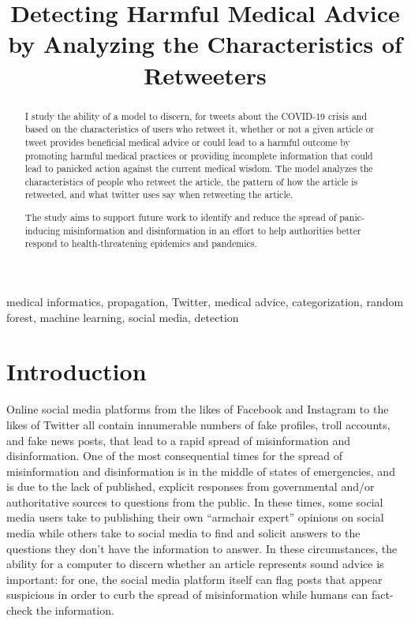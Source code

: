 \documentclass[conference]{IEEEtran}
\begin{document}
\title{Detecting Harmful Medical Advice by Analyzing the
	Characteristics of Retweeters}

\author{
	}

\maketitle

\begin{abstract}
	I study the ability of a model to discern, for tweets about the
	COVID-19 crisis and based on the characteristics of users who
	retweet it, whether or not a given article or tweet provides
	beneficial medical advice or could lead to a harmful outcome by
	promoting harmful medical practices or providing incomplete
	information that could lead to panicked action against the
	current medical wisdom. The model analyzes the characteristics
	of people who retweet the article, the pattern of how the
	article is retweeted, and what twitter uses say when retweeting
	the article.

	The study aims to support future work to identify and reduce
	the spread of panic-inducing misinformation and disinformation
	in an effort to help authorities better respond to
	health-threatening epidemics and pandemics.
\end{abstract}

\begin{IEEEkeywords}medical informatics, propagation, Twitter,
	medical advice, categorization, random forest, machine learning,
	social media, detection \end{IEEEkeywords}

\section{Introduction}

Online social media platforms from the likes of Facebook and
Instagram to the likes of Twitter all contain innumerable numbers
of fake profiles, troll accounts, and fake news posts, that lead
to a rapid spread of misinformation and disinformation. One of
the most consequential times for the spread of misinformation and
disinformation is in the middle of states of emergencies, and is
due to the lack of published, explicit responses from
governmental and/or authoritative sources to questions from the
public.  In these times, some social media users take to
publishing their own ``armchair expert'' opinions on social media
while others take to social media to find and solicit answers to
the questions they don’t have the information to answer. In these
circumstances, the ability for a computer to discern whether an
article represents sound advice is important: for one, the social
media platform itself can flag posts that appear suspicious in
order to curb the spread of misinformation while humans can
fact-check the information.
\end{document}
